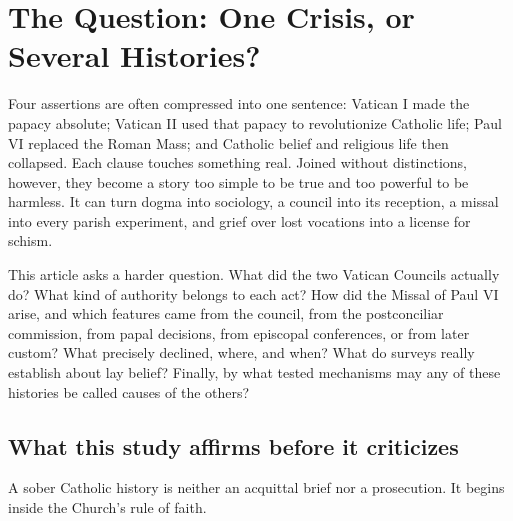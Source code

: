 \section{The Question: One Crisis, or Several Histories?}

Four assertions are often compressed into one sentence: Vatican I made the papacy absolute; Vatican II used that papacy to revolutionize Catholic life; Paul VI replaced the Roman Mass; and Catholic belief and religious life then collapsed. Each clause touches something real. Joined without distinctions, however, they become a story too simple to be true and too powerful to be harmless. It can turn dogma into sociology, a council into its reception, a missal into every parish experiment, and grief over lost vocations into a license for schism.

This article asks a harder question. What did the two Vatican Councils actually do? What kind of authority belongs to each act? How did the Missal of Paul VI arise, and which features came from the council, from the postconciliar commission, from papal decisions, from episcopal conferences, or from later custom? What precisely declined, where, and when? What do surveys really establish about lay belief? Finally, by what tested mechanisms may any of these histories be called causes of the others?


\subsection{What this study affirms before it criticizes}

A sober Catholic history is neither an acquittal brief nor a prosecution. It begins inside the Church's rule of faith.


